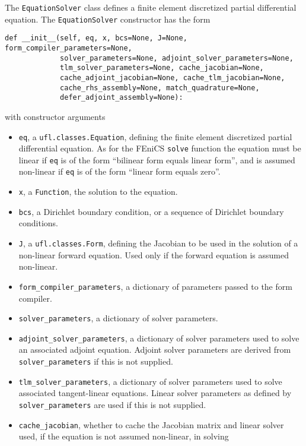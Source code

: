 \documentclass[11pt]{article}
\begin{document}
The \texttt{EquationSolver} class defines a finite element discretized partial
differential equation. The \texttt{EquationSolver} constructor has the form
\begin{lstlisting}
def __init__(self, eq, x, bcs=None, J=None, form_compiler_parameters=None,
             solver_parameters=None, adjoint_solver_parameters=None,
             tlm_solver_parameters=None, cache_jacobian=None,
             cache_adjoint_jacobian=None, cache_tlm_jacobian=None,
             cache_rhs_assembly=None, match_quadrature=None,
             defer_adjoint_assembly=None):
\end{lstlisting}
with constructor arguments
\begin{itemize}
  \item \texttt{eq}, a \texttt{ufl.classes.Equation}, defining the finite
    element discretized partial differential equation. As for the FEniCS
    \texttt{solve} function the equation must be linear if \texttt{eq} is of
    the form ``bilinear form equals linear form'', and is assumed non-linear if
    \texttt{eq} is of the form ``linear form equals zero''.
  \item \texttt{x}, a \texttt{Function}, the solution to the equation.
  \item \texttt{bcs}, a Dirichlet boundary condition, or a sequence of
    Dirichlet boundary conditions.
  \item \texttt{J}, a \texttt{ufl.classes.Form}, defining the Jacobian to be
    used in the solution of a non-linear forward equation. Used only if the
    forward equation is assumed non-linear.
  \item \texttt{form\_compiler\_parameters}, a dictionary of parameters passed
    to the form compiler.
  \item \texttt{solver\_parameters}, a dictionary of solver parameters.
  \item \texttt{adjoint\_solver\_parameters}, a dictionary of solver parameters
    used to solve an associated adjoint equation. Adjoint solver parameters are
    derived from \texttt{solver\_parameters} if this is not supplied.
  \item \texttt{tlm\_solver\_parameters}, a dictionary of solver parameters
    used to solve associated tangent-linear equations. Linear solver parameters
    as defined by \texttt{solver\_parameters} are used if this is not supplied.
  \item \texttt{cache\_jacobian}, whether to cache the Jacobian matrix and
    linear solver used, if the equation is not assumed non-linear, in solving

\end{itemize}
\end{document}
